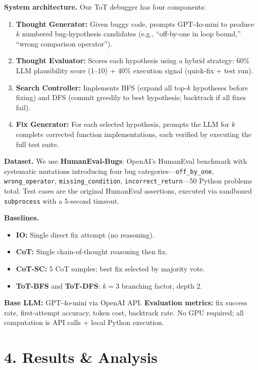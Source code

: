 \documentclass[11pt,letterpaper]{article}
\begin{document}
\textbf{System architecture.} Our ToT debugger has four components:
\begin{enumerate}[noitemsep,topsep=2pt]
  \item \textbf{Thought Generator:} Given buggy code, prompts GPT-4o-mini to produce $k$ numbered
    bug-hypothesis candidates (e.g., ``off-by-one in loop bound,'' ``wrong comparison operator'').
  \item \textbf{Thought Evaluator:} Scores each hypothesis using a hybrid strategy:
    60\% LLM plausibility score (1–10) + 40\% execution signal (quick-fix + test run).
  \item \textbf{Search Controller:} Implements BFS (expand all top-$k$ hypotheses before fixing)
    and DFS (commit greedily to best hypothesis; backtrack if all fixes fail).
  \item \textbf{Fix Generator:} For each selected hypothesis, prompts the LLM for $k$ complete
    corrected function implementations, each verified by executing the full test suite.
\end{enumerate}

\textbf{Dataset.} We use \textbf{HumanEval-Bugs}: OpenAI's HumanEval benchmark with
systematic mutations introducing four bug categories—\texttt{off\_by\_one}, \texttt{wrong\_operator},
\texttt{missing\_condition}, \texttt{incorrect\_return}—50 Python problems total.
Test cases are the original HumanEval assertions, executed via sandboxed \texttt{subprocess}
with a 5-second timeout.

\textbf{Baselines.}
\begin{itemize}[noitemsep,topsep=2pt]
  \item \textbf{IO:} Single direct fix attempt (no reasoning).
  \item \textbf{CoT:} Single chain-of-thought reasoning then fix.
  \item \textbf{CoT-SC:} 5 CoT samples; best fix selected by majority vote.
  \item \textbf{ToT-BFS} and \textbf{ToT-DFS}: $k=3$ branching factor, depth 2.
\end{itemize}

\textbf{Base LLM:} GPT-4o-mini via OpenAI API.
\textbf{Evaluation metrics:} fix success rate, first-attempt accuracy, token cost, backtrack rate.
No GPU required; all computation is API calls + local Python execution.

\section*{4. Results \& Analysis}
\end{document}

